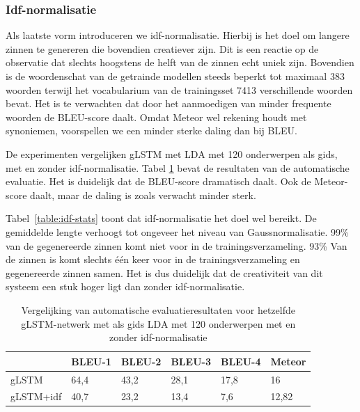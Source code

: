 \subsubsection{Idf-normalisatie}
Als laatste vorm introduceren we idf-normalisatie. Hierbij is het doel om langere zinnen te genereren die bovendien creatiever zijn.
Dit is een reactie op de observatie dat slechts hoogstens de helft van de zinnen echt uniek zijn. Bovendien is de woordenschat van de getrainde modellen steeds beperkt tot
maximaal 383 woorden terwijl het vocabularium van de trainingsset 7413 verschillende woorden bevat.
Het is te verwachten dat door het aanmoedigen van minder frequente woorden de BLEU-score daalt. Omdat Meteor wel rekening houdt met synoniemen, voorspellen we een minder sterke daling dan bij BLEU.

De experimenten vergelijken gLSTM met LDA met 120 onderwerpen als gids, met en zonder idf-normalisatie.
Tabel \ref{table:idf-results} bevat de resultaten van de automatische evaluatie. Het is duidelijk dat de BLEU-score dramatisch daalt. Ook de Meteor-score daalt, maar de daling is zoals verwacht minder sterk.

Tabel~\ref{table:idf-stats} toont dat idf-normalisatie het doel wel bereikt. De gemiddelde lengte verhoogt tot ongeveer het niveau van Gaussnormalisatie. 99\% van de gegenereerde zinnen komt niet voor in de trainingsverzameling. 93\% Van de zinnen is komt slechts \'e\'en keer voor in de trainingsverzameling en gegenereerde zinnen samen. Het is dus duidelijk dat de creativiteit van dit systeem een stuk hoger ligt dan zonder idf-normalisatie.
\begin{table}
	\centering
	\begin{tabular}{llllll}
		~                  & BLEU-1 & BLEU-2 & BLEU-3 & BLEU-4 & Meteor \\ \hline
		gLSTM        & 64,4   & 43,2 			& 28,1   & 17,8   & 16 \\
		gLSTM+idf   & 40,7   & 23,2   & 13,4   & 7,6 & 12,82 \\ \hline
		
	\end{tabular}
	
	\caption{Vergelijking van automatische evaluatieresultaten voor hetzelfde gLSTM-netwerk met als gids LDA met 120 onderwerpen met en zonder idf-normalisatie}
	\label{table:idf-results}
\end{table}

